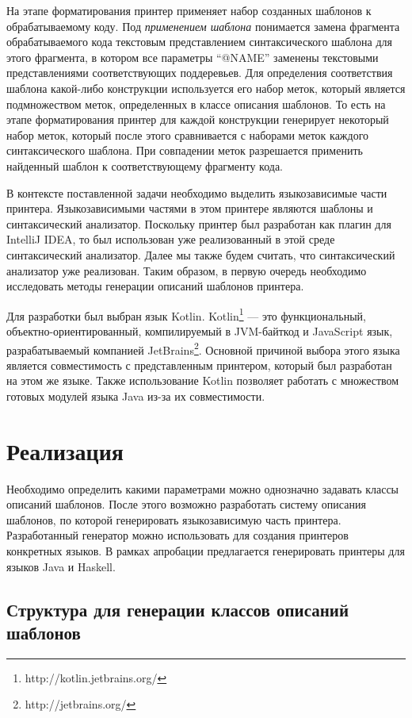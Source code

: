 \documentclass{matmex-diploma}
\begin{document}
На этапе форматирования принтер применяет набор созданных шаблонов к обрабатываемому коду. Под \textit{применением шаблона} понимается замена фрагмента обрабатываемого кода текстовым представлением синтаксического шаблона для этого фрагмента, в котором все параметры “@NAME” заменены текстовыми представлениями соответствующих поддеревьев. Для определения соответствия шаблона какой-либо конструкции используется его набор меток, который является подмножеством меток, определенных в классе описания шаблонов. То есть на этапе форматирования принтер для каждой конструкции генерирует некоторый набор меток, который после этого сравнивается с наборами меток каждого синтаксического шаблона. При совпадении меток разрешается применить найденный шаблон к соответствующему фрагменту кода.

В контексте поставленной задачи необходимо выделить языкозависимые части принтера. Языкозависимыми частями в этом принтере являются шаблоны и синтаксический анализатор. Поскольку принтер был разработан как плагин для IntelliJ IDEA, то был использован уже реализованный в этой среде синтаксический анализатор. Далее мы также будем считать, что синтаксический анализатор уже реализован. Таким образом, в первую очередь необходимо исследовать методы генерации описаний шаблонов принтера. 

Для разработки был выбран язык Kotlin. Kotlin\footnote{http://kotlin.jetbrains.org/} --- это функциональный, объектно-ориентированный, компилируемый в JVM-байткод и JavaScript язык, разрабатываемый компанией JetBrains\footnote{http://jetbrains.org/}. Основной причиной выбора этого языка является совместимость с представленным принтером, который был разработан на этом же языке. Также использование Kotlin позволяет работать с множеством готовых модулей языка Java из-за их совместимости.  

\section{Реализация}
Необходимо определить какими параметрами можно однозначно задавать классы описаний шаблонов. После этого возможно разработать систему описания шаблонов, по которой генерировать языкозависимую часть принтера. Разработанный генератор можно использовать для создания принтеров конкретных языков. В рамках апробации предлагается генерировать принтеры для языков Java и Haskell.

\subsection{Структура для генерации классов описаний шаблонов}
\end{document}
